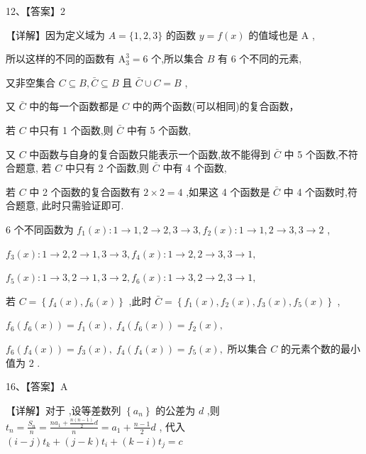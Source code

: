 \documentclass[10pt]{article}
\newcommand*\circled[1]{\tikz[baseline=(char.base)]{\node[shape=circle,draw,inner sep=1.5pt] (char) {\small #1};}}
\begin{document}
12、【答案】2

【详解】因为定义域为 \(A = \{ 1,2,3\}\) 的函数 \(y = f\left( x\right)\) 的值域也是 \(\mathrm{A}\) ,

所以这样的不同的函数有 \({\mathrm{A}}_{3}^{3} = 6\) 个,所以集合 \(B\) 有 6 个不同的元素,

又非空集合 \(C \subseteq  B,\bar{C} \subseteq  B\) 且 \(\bar{C} \cup  C = B\) ,

又 \(\bar{C}\) 中的每一个函数都是 \(C\) 中的两个函数(可以相同)的复合函数，

若 \(C\) 中只有 1 个函数,则 \(\bar{C}\) 中有 5 个函数,

又 \(C\) 中函数与自身的复合函数只能表示一个函数,故不能得到 \(\bar{C}\) 中 5 个函数,不符合题意, 若 \(C\) 中只有 2 个函数,则 \(\bar{C}\) 中有 4 个函数,

若 \(C\) 中 2 个函数的复合函数有 \(2 \times  2 = 4\) ,如果这 4 个函数是 \(\bar{C}\) 中 4 个函数时,符合题意, 此时只需验证即可.

6 个不同函数为 \({f}_{1}\left( x\right)  : 1 \rightarrow  1,2 \rightarrow  2,3 \rightarrow  3,{f}_{2}\left( x\right)  : 1 \rightarrow  1,2 \rightarrow  3,3 \rightarrow  2\) ,

\({f}_{3}\left( x\right)  : 1 \rightarrow  2,2 \rightarrow  1,3 \rightarrow  3,{f}_{4}\left( x\right)  : 1 \rightarrow  2,2 \rightarrow  3,3 \rightarrow  1,\)

\({f}_{5}\left( x\right)  : 1 \rightarrow  3,2 \rightarrow  1,3 \rightarrow  2,{f}_{6}\left( x\right)  : 1 \rightarrow  3,2 \rightarrow  2,3 \rightarrow  1,\)

若 \(C = \left\{  {{f}_{4}\left( x\right) ,{f}_{6}\left( x\right) }\right\}\) ,此时 \(\bar{C} = \left\{  {{f}_{1}\left( x\right) ,{f}_{2}\left( x\right) ,{f}_{3}\left( x\right) ,{f}_{5}\left( x\right) }\right\}\) ,

\({f}_{6}\left( {{f}_{6}\left( x\right) }\right)  = {f}_{1}\left( x\right) ,\;{f}_{4}\left( {{f}_{6}\left( x\right) }\right)  = {f}_{2}\left( x\right) ,\)

\({f}_{6}\left( {{f}_{4}\left( x\right) }\right)  = {f}_{3}\left( x\right) ,\;{f}_{4}\left( {{f}_{4}\left( x\right) }\right)  = {f}_{5}\left( x\right) ,\) 所以集合 \(C\) 的元素个数的最小值为 2 .

16、【答案】A

【详解】对于  \circled{1} ,设等差数列 \(\left\{  {a}_{n}\right\}\) 的公差为 \(d\) ,则 \({t}_{n} = \frac{{S}_{n}}{n} = \frac{n{a}_{1} + \frac{n\left( {n - 1}\right) }{2}d}{n} = {a}_{1} + \frac{n - 1}{2}d\) , 代入 \(\left( {i - j}\right) {t}_{k} + \left( {j - k}\right) {t}_{i} + \left( {k - i}\right) {t}_{j} = c\)
\end{document}
